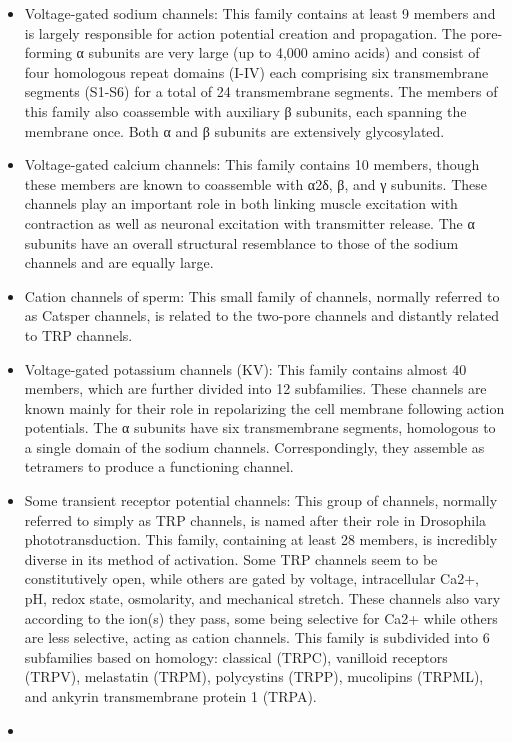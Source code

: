 \begin{itemize}
\tightlist
\item
  Voltage-gated sodium channels: This family contains at least 9 members and is largely responsible for action potential creation and propagation. The pore-forming α subunits are very large (up to 4,000 amino acids) and consist of four homologous repeat domains (I-IV) each comprising six transmembrane segments (S1-S6) for a total of 24 transmembrane segments. The members of this family also coassemble with auxiliary β subunits, each spanning the membrane once. Both α and β subunits are extensively glycosylated.
\item
  Voltage-gated calcium channels: This family contains 10 members, though these members are known to coassemble with α2δ, β, and γ subunits. These channels play an important role in both linking muscle excitation with contraction as well as neuronal excitation with transmitter release. The α subunits have an overall structural resemblance to those of the sodium channels and are equally large.
\item
  Cation channels of sperm: This small family of channels, normally referred to as Catsper channels, is related to the two-pore channels and distantly related to TRP channels.
\item
  Voltage-gated potassium channels (KV): This family contains almost 40 members, which are further divided into 12 subfamilies. These channels are known mainly for their role in repolarizing the cell membrane following action potentials. The α subunits have six transmembrane segments, homologous to a single domain of the sodium channels. Correspondingly, they assemble as tetramers to produce a functioning channel.
\item
  Some transient receptor potential channels: This group of channels, normally referred to simply as TRP channels, is named after their role in Drosophila phototransduction. This family, containing at least 28 members, is incredibly diverse in its method of activation. Some TRP channels seem to be constitutively open, while others are gated by voltage, intracellular Ca2+, pH, redox state, osmolarity, and mechanical stretch. These channels also vary according to the ion(s) they pass, some being selective for Ca2+ while others are less selective, acting as cation channels. This family is subdivided into 6 subfamilies based on homology: classical (TRPC), vanilloid receptors (TRPV), melastatin (TRPM), polycystins (TRPP), mucolipins (TRPML), and ankyrin transmembrane protein 1 (TRPA).
\item

\end{itemize}
